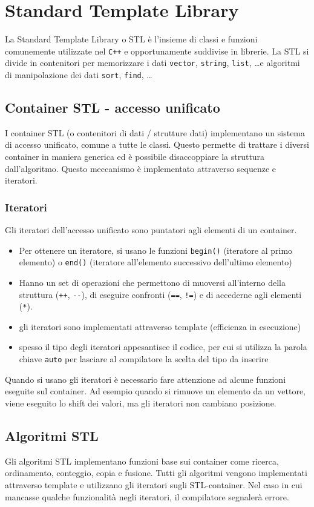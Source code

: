 \documentclass[a4paper]{article}
\begin{document}
\section{Standard Template Library}
La Standard Template Library o STL è l'insieme di classi e funzioni comunemente utilizzate nel \verb|C++| e opportunamente suddivise
in librerie. La STL si divide in contenitori per memorizzare i dati \verb|vector|, \verb|string|, \verb|list|, \dots e algoritmi di
manipolazione dei dati \verb|sort|, \verb|find|, \dots

\subsection{Container STL - accesso unificato}
I container STL (o contenitori di dati / strutture dati) implementano un sistema di accesso unificato, comune a tutte le classi. 
Questo permette di trattare i diversi container in maniera generica ed è possibile disaccoppiare la struttura dall'algoritmo.
Questo meccanismo è implementato attraverso sequenze e iteratori.

\subsubsection*{Iteratori}
Gli iteratori dell'accesso unificato sono puntatori agli elementi di un container. 
\begin{itemize}
	\item Per ottenere un iteratore, si usano le funzioni \verb|begin()| (iteratore al primo elemento) o \verb|end()| (iteratore
	all'elemento successivo dell'ultimo elemento)
	\item Hanno un set di operazioni che permettono di muoversi all'interno della struttura (\verb|++|, \verb|--|), di eseguire
	confronti (\verb|==|, \verb|!=|) e di accederne agli elementi (\verb|*|).
	\item gli iteratori sono implementati attraverso template (efficienza in esecuzione)
	\item spesso il tipo degli iteratori appesantisce il codice, per cui si utilizza la parola chiave \verb|auto| per lasciare
	al compilatore la scelta del tipo da inserire
\end{itemize}
Quando si usano gli iteratori è necessario fare attenzione ad alcune funzioni eseguite sul container. Ad esempio quando si
rimuove un elemento da un vettore, viene eseguito lo shift dei valori, ma gli iteratori non cambiano posizione.

\subsection{Algoritmi STL}
Gli algoritmi STL implementano funzioni base sui container come ricerca, ordinamento, conteggio, copia e fusione. Tutti gli
algoritmi vengono implementati attraverso template e utilizzano gli iteratori sugli STL-container. Nel caso in cui mancasse
qualche funzionalità negli iteratori, il compilatore segnalerà errore.
\end{document}
